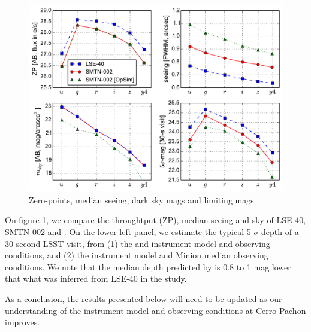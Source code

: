 \documentclass[\docopts]{\docclass}
\begin{document}
\begin{figure}[t]
\begin{center}
\includegraphics[width=\linewidth]{lsst_model_summary.pdf}
\caption{Zero-points, median seeing, dark sky mags and limiting mags}
\label{fig:lsst_model_summary}
\end{center}
\end{figure}


On figure \ref{fig:lsst_model_summary}, we compare the throughtput
(ZP), median seeing and sky of LSE-40, SMTN-002 and
.  On the lower left panel, we estimate the typical
5-$\sigma$ depth of a 30-second LSST visit, from (1) the 
and  instrument model and observing conditions, and (2)
the  instrument model and Minion median observing
conditions. We note that the median depth predicted by 
is 0.8 to 1 mag lower that what was inferred from LSE-40 in the
\cite{2014A&A...572A..80A} study.


As a conclusion, the results presented below will need to be updated
as our understanding of the instrument model and observing conditions
at Cerro Pachon improves.


\end{document}
